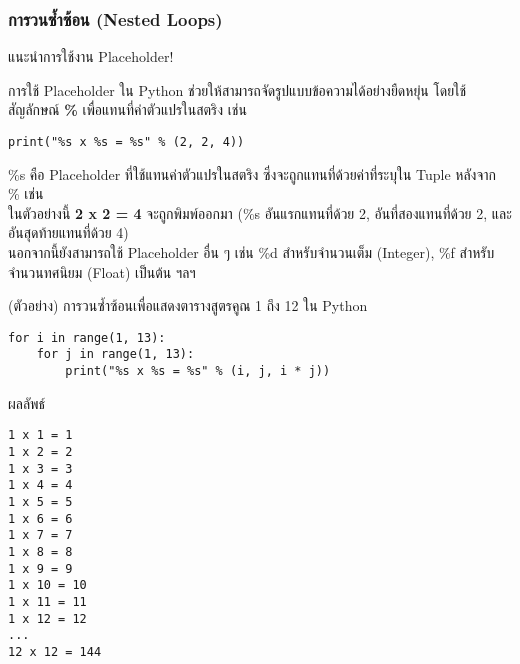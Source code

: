 \documentclass[12pt,a4paper]{article}
\newcommand{\textlight}[1]{{\thailightfont #1}}
\begin{document}
\vspace{4cm}

\subsubsection{การวนซ้ำซ้อน (Nested Loops)}

\hspace{1cm}\textlight{การวนซ้ำซ้อน (Nested Loops) คือการใช้คำสั่งวนซ้ำภายในคำสั่งวนซ้ำอีกครั้ง ซึ่งช่วยให้สามารถทำงานกับชุดข้อมูลที่มีโครงสร้างซับซ้อนได้ เช่น การทำงานกับตารางหรือเมทริกซ์ที่มีหลายมิติ หรือ การเรียงตัวเลขจากเล็กไปใหญ่ในลิสต์ เป็นต้น ฯลฯ}

\begin{noticebox}{แนะนำการใช้งาน Placeholder!}

\textlight{การใช้ Placeholder ใน Python ช่วยให้สามารถจัดรูปแบบข้อความได้อย่างยืดหยุ่น โดยใช้สัญลักษณ์ \textbf{\%} เพื่อแทนที่ค่าตัวแปรในสตริง เช่น}

\begin{codebox}{}
\begin{lstlisting}[style=python]
print("%s x %s = %s" % (2, 2, 4))
\end{lstlisting}
\end{codebox}

\textlight{\%s คือ Placeholder ที่ใช้แทนค่าตัวแปรในสตริง ซึ่งจะถูกแทนที่ด้วยค่าที่ระบุใน Tuple หลังจาก \% เช่น \\ ในตัวอย่างนี้ \textbf{2 x 2 = 4} จะถูกพิมพ์ออกมา (\%s อันแรกแทนที่ด้วย 2, อันที่สองแทนที่ด้วย 2, และอันสุดท้ายแทนที่ด้วย 4) \\[0.5cm] นอกจากนี้ยังสามารถใช้ Placeholder อื่น ๆ เช่น \%d สำหรับจำนวนเต็ม (Integer), \%f สำหรับจำนวนทศนิยม (Float) เป็นต้น ฯลฯ}

\end{noticebox}

\begin{codebox}{(ตัวอย่าง) การวนซ้ำซ้อนเพื่อแสดงตารางสูตรคูณ 1 ถึง 12 ใน Python}
\begin{lstlisting}[style=python]
for i in range(1, 13):
    for j in range(1, 13):
        print("%s x %s = %s" % (i, j, i * j))
\end{lstlisting}
\end{codebox}

\begin{resultbox}{ผลลัพธ์}
\begin{verbatim}
1 x 1 = 1
1 x 2 = 2
1 x 3 = 3
1 x 4 = 4
1 x 5 = 5
1 x 6 = 6
1 x 7 = 7
1 x 8 = 8
1 x 9 = 9
1 x 10 = 10
1 x 11 = 11
1 x 12 = 12
...
12 x 12 = 144
\end{verbatim}
\end{resultbox}
\end{document}
